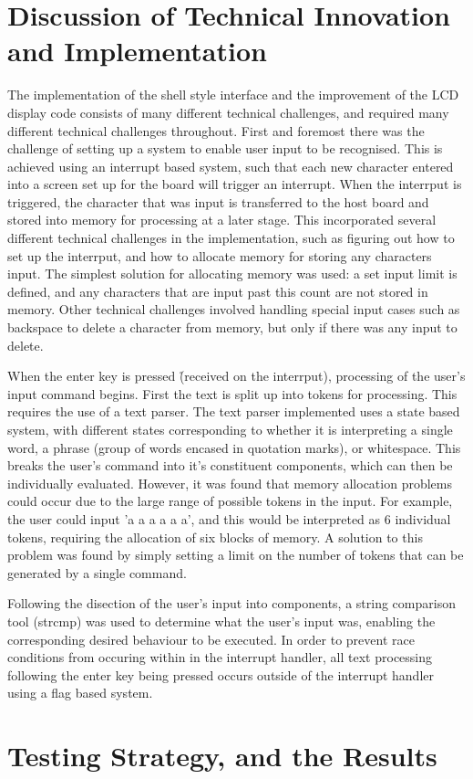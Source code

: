 \section{Discussion of Technical Innovation and Implementation}

The implementation of the shell style interface and the improvement of the LCD 
display code consists of many different technical challenges, and required many 
different technical challenges throughout. First and foremost there was the 
challenge of setting up a system to enable user input to be recognised. This is 
achieved using an interrupt based system, such that each new character entered into 
a screen set up for the board will trigger an interrupt. When the interrput is 
triggered, the character that was input is transferred to the host board and stored into 
memory for processing at a later stage. This incorporated several different technical 
challenges in the implementation, such as figuring out how to set up the interrput, and 
how to allocate memory for storing any characters input. The simplest solution for 
allocating memory was used: a set input limit is defined, and any characters that are 
input past this count are not stored in memory. Other technical challenges involved handling 
special input cases such as backspace to delete a character from memory, but only if there 
was any input to delete. 
\par\bigskip\noindent
When the enter key is pressed (\r\n received on the interrput), processing of the user's 
input command begins. 
First the text is split up into tokens for processing. This 
requires the use of a text parser. The text parser implemented uses a state based system,
with different states corresponding to whether it is interpreting a single word, a phrase 
(group of words encased in quotation marks), or whitespace. This breaks the user's 
command into it's constituent components, which can then be individually evaluated. 
However, it was found that memory allocation problems could occur due to the large range of 
possible tokens in the input. For example, the user could input 'a a a a a a', and this 
would be interpreted as 6 individual tokens, requiring the allocation of six blocks of 
memory. A solution to this problem was found by simply setting a limit on the number 
of tokens that can be generated by a single command. 
\par\bigskip\noindent
Following the disection of the user's input into components, a string comparison tool (strcmp)
was used to determine what the user's input was, enabling the corresponding desired 
behaviour to be executed. In order to prevent race conditions from occuring within in the 
interrupt handler, all text processing following the enter key being pressed occurs 
outside of the interrupt handler using a flag based system. 


\section{Testing Strategy, and the Results}
